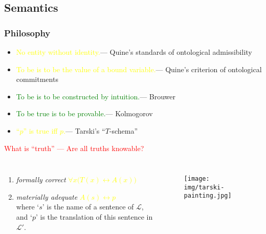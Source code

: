 \documentclass[UTF8,aspectratio=43,11pt,colorlinks,compress,openany]{beamer}%
\begin{document}
\subsection{Semantics}

\begin{frame}\frametitle{Philosophy}
	\begin{itemize}
		\item \textcolor{yellow}{No entity without identity.}\hfill --- Quine's standards of ontological admissibility
		\item \textcolor{yellow}{To be is to be the value of a bound variable.}\hfill --- Quine's criterion of ontological commitments
		\item \textcolor{green}{To be is to be constructed by intuition.}\hfill --- Brouwer
		\item \textcolor{green}{To be true is to be provable.}\hfill --- Kolmogorov
		\item \textcolor{yellow}{``$p$'' is true iff $p$.}\hfill --- Tarski's ``$T$-schema''
	\end{itemize}
			\begin{block}{}
				\centering\textcolor{red}{What is ``truth'' --- Are all truths knowable?}
			\end{block}\vspace{-2ex}
	\begin{columns}
			\begin{enumerate}
				\item \emph{formally correct} \textcolor{yellow}{$\forall x\big(T(x)\leftrightarrow A(x)\big)$}
				\item \emph{materially adequate} \textcolor{yellow}{$A(s)\leftrightarrow p$}\\
				where `$s$' is the name of a sentence of $\mathscr{L}$, and `$p$' is the translation of this sentence
				in $\mathscr{L}'$.
			\end{enumerate}
			\begin{figure}
				\texttt{[image: img/tarski-painting.jpg]}
			\end{figure}
	\end{columns}
\end{frame}
\end{document}
